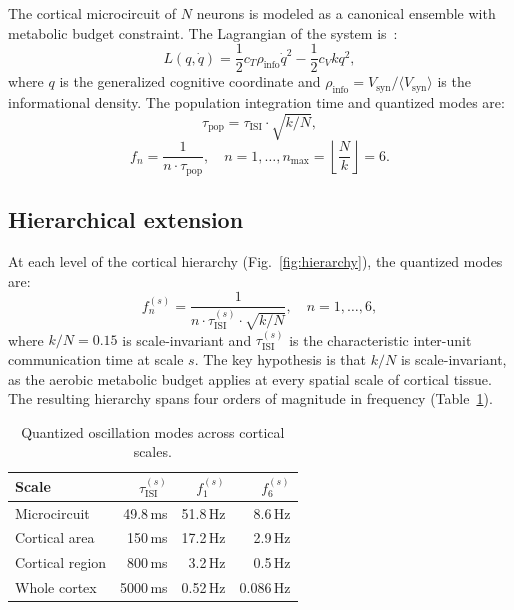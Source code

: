 \documentclass[aps,pre,twocolumn,showpacs,superscriptaddress,longbibliography]{revtex4-2}
\newcommand{\kN}{k/N}
\newcommand{\taupop}{\tau_{\mathrm{pop}}}
\newcommand{\tauISI}{\tau_{\mathrm{ISI}}}
\newcommand{\rhoinfo}{\rho_{\mathrm{info}}}
\begin{document}
The cortical microcircuit of $N$ neurons is modeled as a
canonical ensemble with metabolic budget constraint.
The Lagrangian of the system is~\cite{Santos2025a}:
\begin{equation}
  L(q,\dot{q}) = \frac{1}{2}c_T\rhoinfo\dot{q}^2
               - \frac{1}{2}c_V k q^2,
  \label{eq:lagrangian}
\end{equation}
where $q$ is the generalized cognitive coordinate and
$\rhoinfo = V_{\mathrm{syn}}/\langle V_{\mathrm{syn}}\rangle$
is the informational density.
The population integration time and quantized modes are:
\begin{equation}
  \taupop = \tauISI \cdot \sqrt{\kN},
  \label{eq:taupop}
\end{equation}
\begin{equation}
  f_n = \frac{1}{n \cdot \taupop}, \quad n = 1,\ldots,
  n_{\max} = \left\lfloor \frac{N}{k} \right\rfloor = 6.
  \label{eq:modes}
\end{equation}

\subsection{Hierarchical extension}

At each level of the cortical hierarchy
(Fig.~\ref{fig:hierarchy}), the quantized modes are:
\begin{equation}
  f_n^{(s)} = \frac{1}{n \cdot \tauISI^{(s)} \cdot \sqrt{\kN}},
  \quad n = 1,\ldots,6,
  \label{eq:modes_scaled}
\end{equation}
where $\kN = 0.15$ is scale-invariant and $\tauISI^{(s)}$ is
the characteristic inter-unit communication time at scale $s$.
The key hypothesis is that $\kN$ is scale-invariant, as the
aerobic metabolic budget applies at every spatial scale of
cortical tissue. The resulting hierarchy spans four orders of
magnitude in frequency (Table~\ref{tab:hierarchy}).

\begin{table}[h]
\caption{\label{tab:hierarchy}Quantized oscillation modes
across cortical scales.}
\begin{ruledtabular}
\begin{tabular}{lrrr}
Scale & $\tauISI^{(s)}$ & $f_1^{(s)}$ & $f_6^{(s)}$ \\
\hline
Microcircuit    &  49.8\,ms &  51.8\,Hz &  8.6\,Hz \\
Cortical area   & 150\,ms   &  17.2\,Hz &  2.9\,Hz \\
Cortical region & 800\,ms   &   3.2\,Hz &  0.5\,Hz \\
Whole cortex    & 5000\,ms  &   0.52\,Hz & 0.086\,Hz \\
\end{tabular}
\end{ruledtabular}
\end{table}
\end{document}
